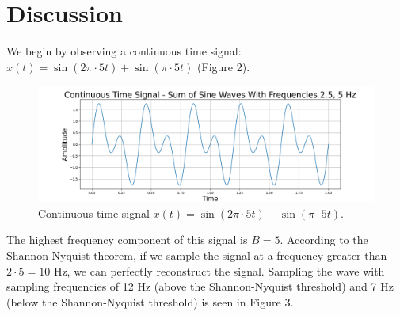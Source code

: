 \documentclass{article}
\begin{document}
\section{Discussion}


We begin by observing a continuous time signal: $x(t) = \sin(2\pi\cdot5t) + \sin(\pi\cdot5t)$ (Figure 2). 
\begin{figure}[H]
    \includegraphics[width=\linewidth]{images/conttimesignal_5_25.png}
    \caption{Continuous time signal $x(t) = \sin(2\pi\cdot5t) + \sin(\pi\cdot5t)$.}
    \label{fig:enter-label}
\end{figure}
The highest frequency component of this signal is $B = 5$. 
According to the Shannon-Nyquist theorem, if we sample the signal at a frequency greater than $2\cdot 5 = 10$ Hz, we can perfectly reconstruct the signal.
Sampling the wave with sampling frequencies of 12 Hz (above the Shannon-Nyquist threshold) and 7 Hz (below the Shannon-Nyquist threshold) is seen in Figure 3.
\end{document}
